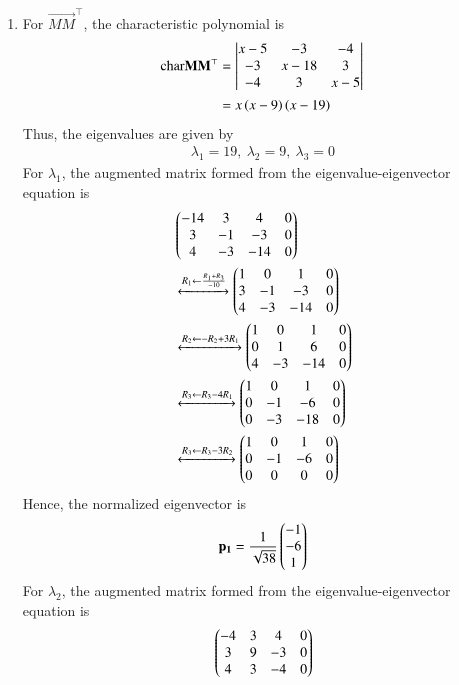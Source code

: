     \begin{enumerate}
        \item For $\vec{MM}^\top$, the characteristic polynomial is
        \begin{align}
		\text{char}{\mathbf{MM}^\top} &= \begin{vmatrix}x-5&-3&-4\\-3&x-18&3\\-4&3&x-5\end{vmatrix} \\
                                      &= x\left(x-9\right)\left(x-19\right)
                                      \label{eq:chapters/12/11/2/16/svd/char-2}
        \end{align}
        Thus, the eigenvalues are given by
        \begin{align}
            \lambda_1 = 19,\ \lambda_2 = 9,\ \lambda_3 = 0
        \end{align}
        For $\lambda_1$, the augmented matrix formed from the 
        eigenvalue-eigenvector equation is
        \begin{align}
            &\begin{pmatrix}-14&3&4&0\\3&-1&-3&0\\4&-3&-14&0\end{pmatrix} \nonumber \\
            &\xleftrightarrow[]{R_1 \leftarrow \frac{R_1+R_3}{-10}} \begin{pmatrix}1&0&1&0\\3&-1&-3&0\\4&-3&-14&0\end{pmatrix} \\
            &\xleftrightarrow[]{R_2 \leftarrow -R_2+3R_1} \begin{pmatrix}1&0&1&0\\0&1&6&0\\4&-3&-14&0\end{pmatrix} \\
            &\xleftrightarrow[]{R_3 \leftarrow R_3-4R_1} \begin{pmatrix}1&0&1&0\\0&-1&-6&0\\0&-3&-18&0\end{pmatrix} \\
            &\xleftrightarrow[]{R_3 \leftarrow R_3-3R_2} \begin{pmatrix}1&0&1&0\\0&-1&-6&0\\0&0&0&0\end{pmatrix}
        \end{align}
        Hence, the normalized eigenvector is
        \begin{align}
            \mathbf{p_1} = \frac{1}{\sqrt{38}}\begin{pmatrix}-1\\-6\\1\end{pmatrix}
        \end{align}
        For $\lambda_2$, the augmented matrix formed from the 
        eigenvalue-eigenvector equation is
        \begin{align}
            &\myvec{-4&3&4&0\\3&9&-3&0\\4&3&-4&0} \nonumber \\

\end{align}
\end{enumerate}
